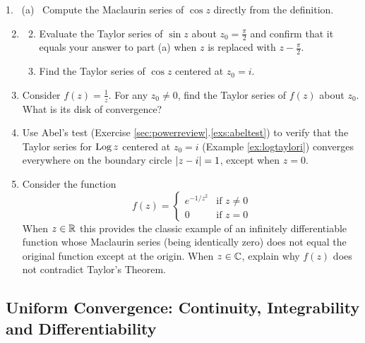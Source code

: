 \begin{exercises}
	\hangindent\doubleind
	\textup{1.} \ (a) \ Compute the Maclaurin series of $\cos z$ directly from the definition.
	\begin{enumerate}\setcounter{enumi}{1}
	  \item[]\begin{enumerate}\setcounter{enumii}{1}\vspace{-3pt}
	    \item Evaluate the Taylor series of $\sin z$ about $z_0=\frac\pi 2$ and confirm that it equals your answer to part (a) when $z$ is replaced with $z-\frac\pi 2$.
	    
	    \item Find the Taylor series of $\cos z$ centered at $z_0=i$.
	  \end{enumerate} 
	  
	  
	  \item Consider $f(z)=\frac 1z$. For any $z_0\neq 0$, find the Taylor series of $f(z)$ about $z_0$. What is its disk of convergence?
	  	  
	  
	  \item\label{exs:abel2} Use Abel's test (Exercise \ref*{sec:powerreview}.\ref{exs:abeltest}) to verify that the Taylor series for $\operatorname{Log} z$ centered at $z_0=i$ (Example \ref{ex:logtaylori}) converges everywhere on the boundary circle $\left| z-i\right|=1$, except when $z=0$.

	    
	  \item\label{ex:maczero} Consider the function
	  \[
	  	f(z)=
	  	\begin{cases}
	  		e^{-1/z^2}&\text{if }z\neq 0\\
	  		0&\text{if }z=0
	  	\end{cases}
	  \]
	  When $z\in\mathbb{R}$ this provides the classic example of an infinitely differentiable function whose Maclaurin series (being identically zero) does not equal the original function except at the origin. When $z\in\mathbb{C}$, explain why $f(z)$ does not contradict Taylor's Theorem.
	  
	\end{enumerate}
\end{exercises}
\clearpage



\subsection[Uniform Convergence]{Uniform Convergence: Continuity, Integrability and Differentiability}\label{sec:unifconv}

